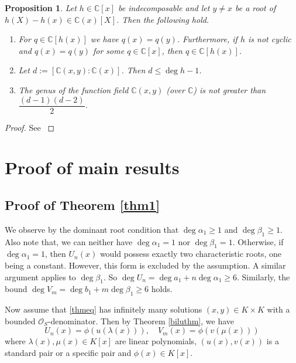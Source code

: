 \documentclass[12pt]{amsart}
\newtheorem{proposition}[theorem]{Proposition}
\begin{document}
\begin{proposition}\label{nlemma1}
Let $h \in \mathbb{C}[x]$ be indecomposable and let $y \neq x$ be a root of 
$h(X) - h(x) \in \mathbb{C}(x)[X]$. Then the following hold.

\begin{enumerate}
    \item[(1)] For $q \in \mathbb{C}[h(x)]$ we have $q(x) = q(y)$. Furthermore, if $h$ is not cyclic and $q(x) = q(y)$ for some $q \in \mathbb{C}[x]$, then $q \in \mathbb{C}[h(x)]$.
    
    \item[(2)] Let $d := [\mathbb{C}(x,y):\mathbb{C}(x)]$. Then $d \leq \deg h - 1$.
    
    \item[(3)] The genus of the function field $\mathbb{C}(x,y)$ (over $\mathbb{C}$) is not greater than $\dfrac{(d-1)(d-2)}{2}$.
\end{enumerate}
\end{proposition}

\begin{proof}
    See \cite[Lemma 5]{fuchs2019decomposable} 
\end{proof}

\section{Proof of main results}	 \label{sec:proof}
 \subsection{Proof of Theorem \ref{thm1}}
	We observe by the dominant root condition that $\deg \alpha_1\geq 1$ and $\deg \beta_1\geq 1$. Also note that, we can neither have $\deg \alpha_1=1$ nor $\deg\beta_1=1$. Otherwise, if $\deg \alpha_1=1$, then $U_n(x)$ would possess exactly two characteristic roots, one being a constant. However, this form is excluded by the assumption. A similar argument applies to $\deg\beta_1$.
    So $\deg U_n=\deg a_1+n \deg \alpha_1\geq 6$. Similarly, the bound $\deg V_m=\deg b_1+m \deg\beta_1\geq 6$ holds. 
	
	Now assume that \eqref{thmeq} has infinitely many solutions $(x,y)\in K\times K$ with a bounded $\mathcal{O}_S$-denominator. Then by Theorem \ref{biluthm}, we have
	\begin{equation}\label{compoeq}
		U_n(x)=\phi(u(\lambda(x))),\quad V_m(x)=\phi(v(\mu(x)))
	\end{equation} where $\lambda(x), \mu(x)\in K[x]$ are linear polynomials, $(u(x),v(x))$ is a standard pair or a specific pair and $\phi(x)\in K[x]$.
	
\end{document}

